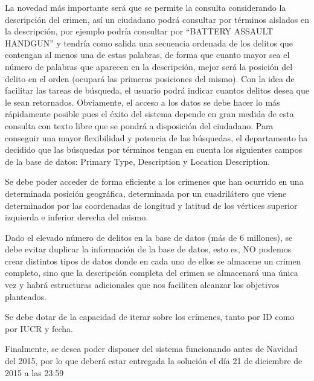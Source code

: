 \begin{DoxyItemize}
\item La novedad más importante será que se permite la consulta considerando la descripción del crimen, así un ciudadano podrá consultar por términos aislados en la descripción, por ejemplo podría consultar por “\+B\+A\+T\+T\+E\+R\+Y A\+S\+S\+A\+U\+L\+T H\+A\+N\+D\+G\+U\+N” y tendría como salida una secuencia ordenada de los delitos que contengan al menos una de estas palabras, de forma que cuanto mayor sea el número de palabras que aparecen en la descripción, mejor será la posición del delito en el orden (ocupará las primeras posiciones del mismo). Con la idea de facilitar las tareas de búsqueda, el usuario podrá indicar cuantos delitos desea que le sean retornados. Obviamente, el acceso a los datos se debe hacer lo más rápidamente posible pues el éxito del sistema depende en gran medida de esta consulta con texto libre que se pondrá a disposición del ciudadano. Para conseguir una mayor flexibilidad y potencia de las búsquedas, el departamento ha decidido que las búsquedas por términos tengan en cuenta los siguientes campos de la base de datos\+: Primary Type, Description y Location Description.\end{DoxyItemize}
\begin{DoxyItemize}
\item Se debe poder acceder de forma eficiente a los crímenes que han ocurrido en una determinada posición geográfica, determinada por un cuadrilátero que viene determinados por las coordenadas de longitud y latitud de los vértices superior izquierda e inferior derecha del mismo.\end{DoxyItemize}
\begin{DoxyItemize}
\item Dado el elevado número de delitos en la base de datos (más de 6 millones), se debe evitar duplicar la información de la base de datos, esto es, N\+O podemos crear distintos tipos de datos donde en cada uno de ellos se almacene un crimen completo, sino que la descripción completa del crimen se almacenará una única vez y habrá estructuras adicionales que nos faciliten alcanzar los objetivos planteados.\end{DoxyItemize}
\begin{DoxyItemize}
\item Se debe dotar de la capacidad de iterar sobre los crímenes, tanto por I\+D como por I\+U\+C\+R y fecha.\end{DoxyItemize}
\begin{DoxyItemize}
\item Finalmente, se desea poder disponer del sistema funcionando antes de Navidad del 2015, por lo que deberá estar entregada la solución el día 21 de diciembre de 2015 a las 23\+:59\end{DoxyItemize}
